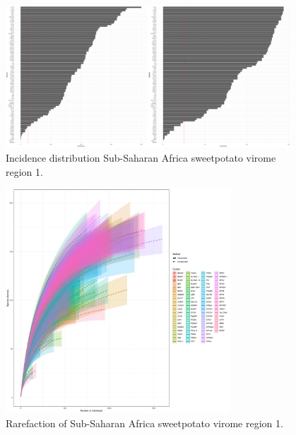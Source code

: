 \documentclass{article}
\begin{document}
\begin{figure}[h!]
\begin{center}
\includegraphics[width=0.95\textwidth]{../results/k-cluster1/1-kcluster_incidence_w+bFeb28.pdf} %
\caption{Incidence distribution Sub-Saharan Africa sweetpotato virome region 1.}
\end{center}
\end{figure}


\begin{figure}[h!]
\begin{center}
\includegraphics[width=0.75\textwidth]{../results/k-cluster1/1-kcluster_rarefaction-iNEXT_Feb28.pdf} %
\caption{Rarefaction of Sub-Saharan Africa sweetpotato virome region 1.}
\end{center}
\end{figure}
\end{document}
